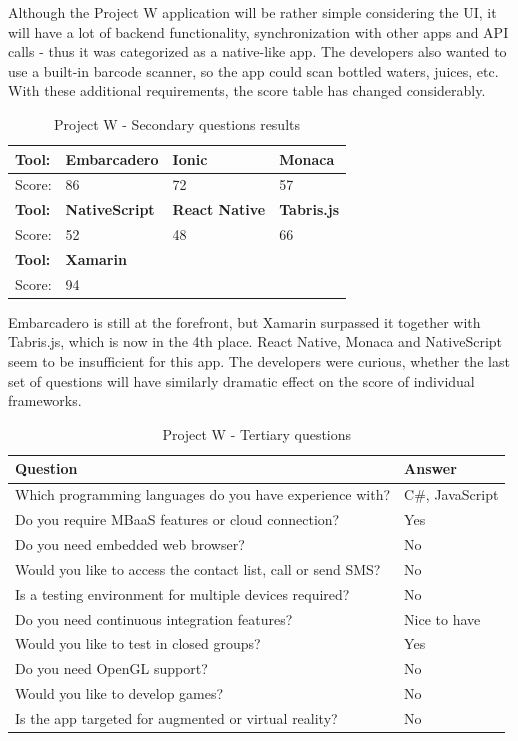 \documentclass[english,master,public,dept460,male,cpdeclaration,oneside]{diploma}
\begin{document}
Although the Project W application will be rather simple considering the UI, it will have a lot of backend functionality, synchronization with other apps and API calls - thus it was categorized as a native-like app. The developers also wanted to use a built-in barcode scanner, so the app could scan bottled waters, juices, etc. With these additional requirements, the score table has changed considerably.

\begin{table}[!h]
	\centering
	\caption{Project W - Secondary questions results}
	\label{table:wResults2}
	\begin{tabular}{p{4cm} | p{3cm} | p{3cm} | p{3cm}}
		\toprule		
		\textbf{Tool:} & \textbf{Embarcadero} & \textbf{Ionic} & \textbf{Monaca} \\ 
		\midrule
		Score: & 86 & 72 & 57 \\ 
		\midrule
		\textbf{Tool:} & \textbf{NativeScript} & \textbf{React Native} & \textbf{Tabris.js} \\
		\midrule
		Score: & 52 & 48 & 66 \\
		\midrule
		\textbf{Tool:}& \textbf{Xamarin} & & \\	
		\midrule
		Score: & 94 & & \\	
		\midrule
	\end{tabular}
\end{table}

Embarcadero is still at the forefront, but Xamarin surpassed it together with Tabris.js, which is now in the 4th place. React Native, Monaca and NativeScript seem to be insufficient for this app. The developers were curious, whether the last set of questions will have similarly dramatic effect on the score of individual frameworks.

\begin{table}[!h]
	\centering
	\caption{Project W - Tertiary questions}
	\label{table:wTertiary}
	\begin{tabular}{p{7.5cm} | p{5cm}}
		\toprule		
		\textbf{Question} &	\textbf{Answer} \\
		\midrule		
		Which programming languages do you have experience with? & C\#, JavaScript \\
		Do you require MBaaS features or cloud connection? & Yes \\
		Do you need embedded web browser? & No \\
		Would you like to access the contact list, call or send SMS? & No \\
		Is a testing environment for multiple devices required? & No \\
		Do you need continuous integration features? & Nice to have \\
		Would you like to test in closed groups? & Yes \\
		Do you need OpenGL support? & No \\
		Would you like to develop games? & No \\
		Is the app targeted for augmented or virtual reality? & No \\			
		\midrule
	\end{tabular}
\end{table}
\end{document}
